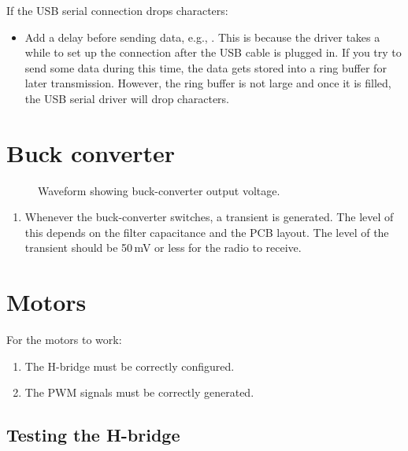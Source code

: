 If the USB serial connection drops characters:
 \begin{itemize}
 \item Add a delay before sending data, e.g., .
   This is because the driver takes a while to set up the connection
   after the USB cable is plugged in.  If you try to send some data
   during this time, the data gets stored into a ring buffer for later
   transmission.  However, the ring buffer is not large and once it is
   filled, the USB serial driver will drop characters.
 \end{itemize}


 \section{Buck converter}
\label{buck-converter-testing}


\begin{figure}[!h]
  \centering
  \caption{Waveform showing buck-converter output voltage.}
\end{figure}


\begin{enumerate}
\item Whenever the buck-converter switches, a transient is generated.
  The level of this depends on the filter capacitance and the PCB
  layout.  The level of the transient should be 50\,mV or less for the
  radio to receive.

\end{enumerate}


\section{Motors}
\label{motors-testing}

For the motors to work:
%
\begin{enumerate}
\item The H-bridge must be correctly configured.
\item The PWM signals must be correctly generated.
\end{enumerate}


\subsection{Testing the H-bridge}
\label{testing-the-h-bridge}

